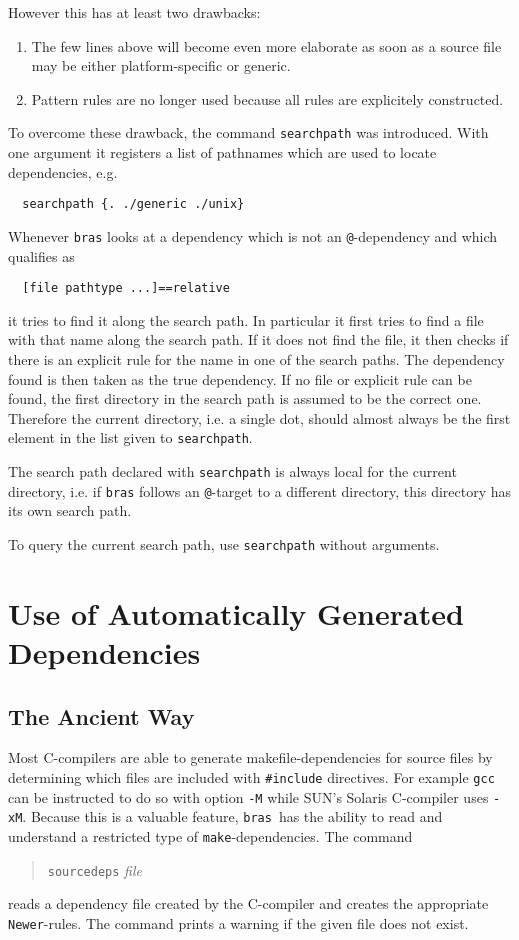 \documentclass[12pt]{article}
\newcommand{\bras}{\texttt{bras}}
\newcommand{\make}{\texttt{make}}
\begin{document}
However this has at least two drawbacks:
\begin{enumerate}
\item The few lines above will become even more elaborate as soon as a
  source file may be either platform-specific or generic.
\item Pattern rules are no longer used because all rules are
  explicitely constructed.
\end{enumerate}

To overcome these drawback, the command \texttt{searchpath} was
introduced. With one argument it registers a list of pathnames which are
used to locate dependencies, e.g.
\begin{verbatim}
  searchpath {. ./generic ./unix}
\end{verbatim}
Whenever \bras{} looks at a dependency which is not an
\texttt{@}-dependency and which qualifies as
\begin{verbatim}
  [file pathtype ...]==relative
\end{verbatim}
it tries to find it along the search path. In particular it first
tries to find a file with that name along the search path. If it does
not find the file, it then
checks if there is an explicit rule for the name in one of the search
paths. The dependency found is then taken as the true dependency. If
no file or explicit rule can be found, the first directory in the
search path is assumed to be the correct one. Therefore the current
directory, i.e. a single dot, should almost always be the first
element in the list given to \texttt{searchpath}.

The search path declared with \texttt{searchpath} is always local for
the current directory, i.e. if \bras{} follows an \texttt{@}-target to
a different directory, this directory has its own search path.

To query the current search path, use \texttt{searchpath} without
arguments. 

\section{Use of Automatically Generated Dependencies}

\subsection{The Ancient Way}
Most C-compilers are able to generate makefile-dependencies for
source files by determining which files are included with
\texttt{\#include} directives. For example \texttt{gcc} can be
instructed to do so with option \texttt{-M} while SUN's Solaris
C-compiler uses \texttt{-xM}. Because this is a valuable feature,
\bras\ has the ability to read and understand a restricted type of
\make-dependencies. The command
\begin{quote}
  \texttt{sourcedeps} \textit{file}
\end{quote}
reads a dependency file created by the C-compiler and creates the
appropriate \texttt{Newer}-rules. The command prints a warning if
the given file does not exist.
\end{document}
